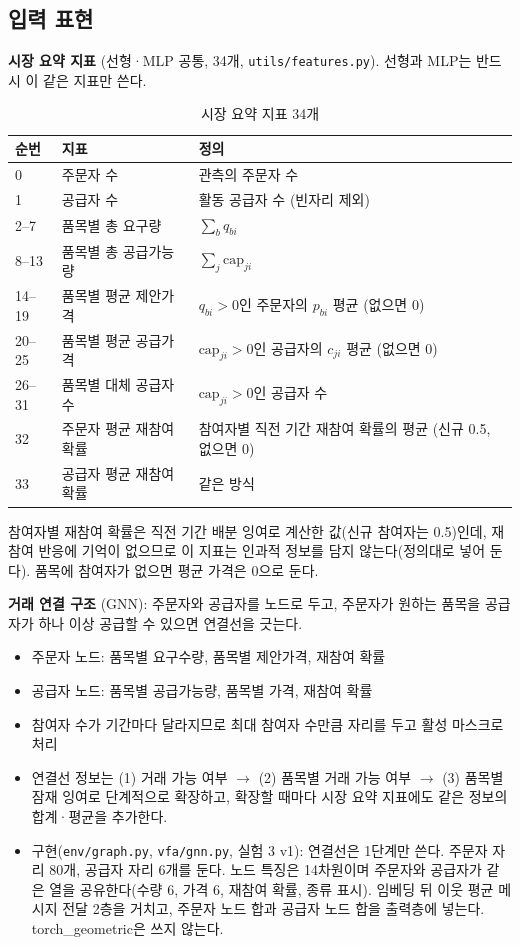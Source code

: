\documentclass[11pt,a4paper]{article}
\begin{document}
\subsection{입력 표현}

\textbf{시장 요약 지표} (선형·MLP 공통, 34개, \texttt{utils/features.py}). 선형과 MLP는 반드시 이 같은 지표만 쓴다.

\begin{table}[H]
\centering\small
\caption{시장 요약 지표 34개}
\begin{tabularx}{\linewidth}{llY}
\toprule
순번 & 지표 & 정의\\
 & 주문자 수 & 관측의 주문자 수\\
1 & 공급자 수 & 활동 공급자 수 (빈자리 제외)\\
2--7 & 품목별 총 요구량 & $\sum_b q_{bi}$\\
8--13 & 품목별 총 공급가능량 & $\sum_j \mathrm{cap}_{ji}$\\
14--19 & 품목별 평균 제안가격 & $q_{bi}>0$인 주문자의 $p_{bi}$ 평균 (없으면 0)\\
20--25 & 품목별 평균 공급가격 & $\mathrm{cap}_{ji}>0$인 공급자의 $c_{ji}$ 평균 (없으면 0)\\
26--31 & 품목별 대체 공급자 수 & $\mathrm{cap}_{ji}>0$인 공급자 수\\
32 & 주문자 평균 재참여 확률 & 참여자별 직전 기간 재참여 확률의 평균 (신규 0.5, 없으면 0)\\
33 & 공급자 평균 재참여 확률 & 같은 방식\\
\bottomrule
\end{tabularx}
\end{table}

참여자별 재참여 확률은 직전 기간 배분 잉여로 계산한 값(신규 참여자는 0.5)인데, 재참여 반응에 기억이 없으므로
이 지표는 인과적 정보를 담지 않는다(정의대로 넣어 둔다). 품목에 참여자가 없으면 평균 가격은 0으로 둔다.

\textbf{거래 연결 구조} (GNN): 주문자와 공급자를 노드로 두고, 주문자가 원하는 품목을
공급자가 하나 이상 공급할 수 있으면 연결선을 긋는다.
\begin{itemize}[leftmargin=1.5em]
  \item 주문자 노드: 품목별 요구수량, 품목별 제안가격, 재참여 확률
  \item 공급자 노드: 품목별 공급가능량, 품목별 가격, 재참여 확률
  \item 참여자 수가 기간마다 달라지므로 최대 참여자 수만큼 자리를 두고 활성 마스크로 처리
  \item 연결선 정보는 (1) 거래 가능 여부 $\to$ (2) 품목별 거래 가능 여부 $\to$ (3) 품목별 잠재 잉여로
        단계적으로 확장하고, 확장할 때마다 시장 요약 지표에도 같은 정보의 합계·평균을 추가한다.
  \item 구현(\texttt{env/graph.py}, \texttt{vfa/gnn.py}, 실험 3 v1): 연결선은 1단계만 쓴다.
        주문자 자리 80개, 공급자 자리 6개를 둔다. 노드 특징은 14차원이며 주문자와 공급자가 같은 열을 공유한다(수량 6, 가격 6, 재참여 확률, 종류 표시).
        임베딩 뒤 이웃 평균 메시지 전달 2층을 거치고, 주문자 노드 합과 공급자 노드 합을 출력층에 넣는다. torch\_geometric은 쓰지 않는다.
\end{itemize}
\end{document}
